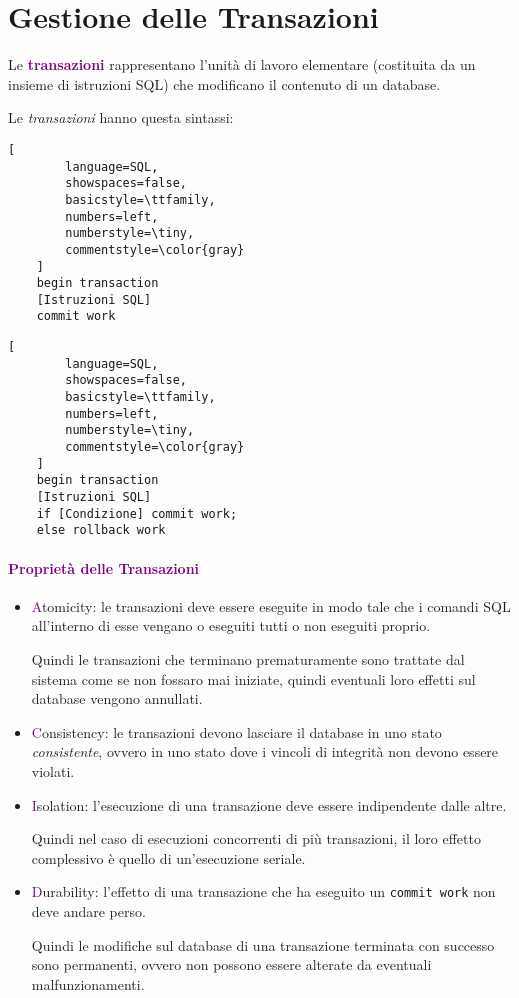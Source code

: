 \newpage
\section{Gestione delle Transazioni}

Le \textbf{\textcolor{purple}{transazioni}} rappresentano l'unità
di lavoro elementare (costituita da un insieme di istruzioni SQL) che
modificano il contenuto di un database.

Le \emph{transazioni} hanno questa sintassi:
\begin{multicols}{2}
    \begin{lstlisting}[
        language=SQL,
        showspaces=false,
        basicstyle=\ttfamily,
        numbers=left,
        numberstyle=\tiny,
        commentstyle=\color{gray}
    ]
    begin transaction
    [Istruzioni SQL]
    commit work
    \end{lstlisting}
    \columnbreak
    \begin{lstlisting}[
        language=SQL,
        showspaces=false,
        basicstyle=\ttfamily,
        numbers=left,
        numberstyle=\tiny,
        commentstyle=\color{gray}
    ]
    begin transaction
    [Istruzioni SQL]
    if [Condizione] commit work;
    else rollback work
    \end{lstlisting}
\end{multicols}

\paragraph{\textcolor{purple}{Proprietà delle Transazioni}}

\begin{itemize}
    \item \textcolor{purple}{A}tomicity: le transazioni deve essere eseguite in modo tale
        che i comandi SQL all'interno di esse vengano o eseguiti tutti o non eseguiti proprio.

        Quindi le transazioni che terminano prematuramente sono trattate dal sistema come se non fossaro
        mai iniziate, quindi eventuali loro effetti sul database vengono annullati.
    \item \textcolor{purple}{C}onsistency: le transazioni devono lasciare il database in uno stato
        \emph{consistente}, ovvero in uno stato dove i vincoli di integrità non devono essere violati.
    \item \textcolor{purple}{I}solation: l'esecuzione di una transazione deve essere indipendente dalle altre.

        Quindi nel caso di esecuzioni concorrenti di più transazioni, il loro effetto complessivo
        è quello di un'esecuzione seriale.
    \item \textcolor{purple}{D}urability: l'effetto di una transazione che ha eseguito un \verb|commit work|
        non deve andare perso.

        Quindi le modifiche sul database di una transazione terminata con successo
        sono permanenti, ovvero non possono essere alterate da eventuali malfunzionamenti.
\end{itemize}

